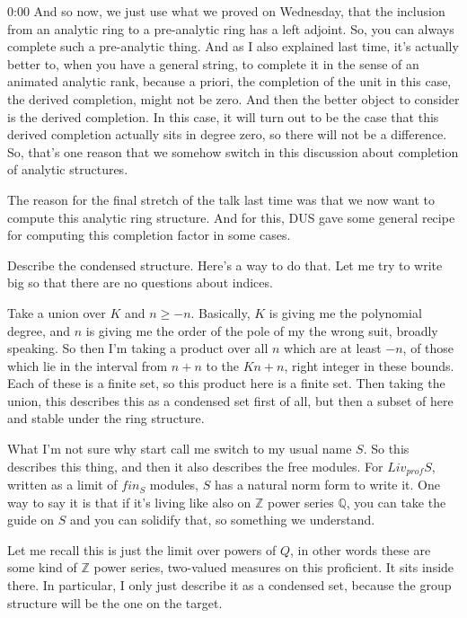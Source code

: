 \begin{unfinished}{0:00}
And so now, we just use what we proved on Wednesday, that the inclusion from an analytic ring to a pre-analytic ring has a left adjoint. So, you can always complete such a pre-analytic thing. And as I also explained last time, it's actually better to, when you have a general string, to complete it in the sense of an animated analytic rank, because a priori, the completion of the unit in this case, the derived completion, might not be zero. And then the better object to consider is the derived completion. In this case, it will turn out to be the case that this derived completion actually sits in degree zero, so there will not be a difference. So, that's one reason that we somehow switch in this discussion about completion of analytic structures.

The reason for the final stretch of the talk last time was that we now want to compute this analytic ring structure. And for this, DUS gave some general recipe for computing this completion factor in some cases.

Describe the condensed structure. Here's a way to do that. Let me try to write big so that there are no questions about indices.

Take a union over $K$ and $n \geq -n$. Basically, $K$ is giving me the polynomial degree, and $n$ is giving me the order of the pole of my the wrong suit, broadly speaking. So then I'm taking a product over all $n$ which are at least $-n$, of those which lie in the interval from $n + n$ to the $Kn + n$, right integer in these bounds. Each of these is a finite set, so this product here is a finite set. Then taking the union, this describes this as a condensed set first of all, but then a subset of here and stable under the ring structure.

What I'm not sure why start call me switch to my usual name $S$. So this describes this thing, and then it also describes the free modules. For $Liv_{prof} S$, written as a limit of $fin_S$ modules, $S$ has a natural norm form to write it. One way to say it is that if it's living like also on $\mathbb{Z}$ power series $\mathbb{Q}$, you can take the guide on $S$ and you can solidify that, so something we understand.

Let me recall this is just the limit over powers of $Q$, in other words these are some kind of $\mathbb{Z}$ power series, two-valued measures on this proficient. It sits inside there. In particular, I only just describe it as a condensed set, because the group structure will be the one on the target.


\end{unfinished}
